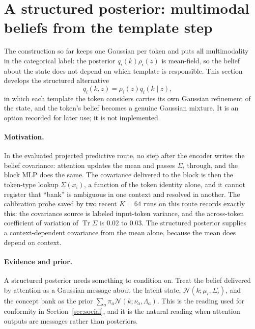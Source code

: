 \documentclass[11pt]{article}
\theoremstyle{definition}
\theoremstyle{remark}
\newcommand{\Tr}{\operatorname{Tr}}
\newcommand{\N}{\mathcal{N}}
\begin{document}
\section{A structured posterior: multimodal beliefs from the template step}
\label{sec:structured}

The construction so far keeps one Gaussian per token and puts all multimodality in the categorical label: the posterior $q_i(k)\rho_i(z)$ is mean-field, so the belief about the state does not depend on which template is responsible. This section develops the structured alternative
\begin{equation}
q_i(k,z)=\rho_i(z)q_i(k\mid z),
\label{eq:structured}
\end{equation}
in which each template the token considers carries its own Gaussian refinement of the state, and the token's belief becomes a genuine Gaussian mixture. It is an option recorded for later use; it is not implemented.

\paragraph{Motivation.}
In the evaluated projected predictive route, no step after the encoder writes the belief covariance: attention updates the mean and passes $\Sigma_i$ through, and the block MLP does the same. The covariance delivered to the block is then the token-type lookup $\Sigma(x_i)$, a function of the token identity alone, and it cannot register that ``bank'' is ambiguous in one context and resolved in another. The calibration probe saved by two recent $K=64$ runs on this route records exactly this: the covariance source is labeled input-token variance, and the across-token coefficient of variation of $\Tr\Sigma$ is $0.02$ to $0.03$. The structured posterior supplies a context-dependent covariance from the mean alone, because the mean does depend on context.

\paragraph{Evidence and prior.}
A structured posterior needs something to condition on. Treat the belief delivered by attention as a Gaussian message about the latent state, $\N(k;\mu_i,\Sigma_i)$, and the concept bank as the prior $\sum_a\pi_a\N(k;\nu_a,\Lambda_a)$. This is the reading used for conformity in Section~\ref{sec:social}, and it is the natural reading when attention outputs are messages rather than posteriors.
\end{document}
